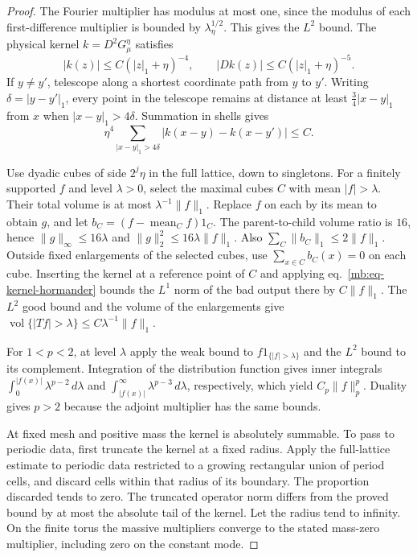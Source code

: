 \documentclass[11pt,letterpaper,reqno]{amsart}
\numberwithin{equation}{section}
\renewcommand{\eqref}[1]{\textup{eq.~\ref{#1}}}
\theoremstyle{definition}
\theoremstyle{remark}
\begin{document}
\begin{proof}
The Fourier multiplier has modulus at most one, since the
modulus of each first-difference multiplier is bounded by
\(\lambda_\eta^{1/2}\). This gives the \(L^2\) bound.
The physical kernel \(k=D^2G_\mu^\eta\) satisfies
\[
 |k(z)|\le C(|z|_1+\eta)^{-4},
 \qquad |Dk(z)|\le C(|z|_1+\eta)^{-5}.
\]
If \(y\ne y'\), telescope along a shortest coordinate path from
\(y\) to \(y'\). Writing \(\delta=|y-y'|_1\), every point in the
telescope remains at distance at least \(\tfrac34|x-y|_1\) from
\(x\) when \(|x-y|_1>4\delta\). Summation in shells gives
\begin{equation}\label{mb:eq-kernel-hormander}
 \eta^4\sum_{|x-y|_1>4\delta}
             |k(x-y)-k(x-y')|\le C .
\end{equation}

Use dyadic cubes of side \(2^j\eta\) in the full lattice, down to
singletons. For a finitely supported \(f\) and level \(\lambda>0\),
select the maximal cubes \(C\) with mean \(|f|>\lambda\).
Their total volume is at most \(\lambda^{-1}\|f\|_1\).
Replace \(f\) on each by its mean to obtain \(g\), and let
\(b_C=(f-\operatorname{mean}_C f)1_C\). The parent-to-child
volume ratio is \(16\), hence \(\|g\|_\infty\le16\lambda\)
and \(\|g\|_2^2\le16\lambda\|f\|_1\). Also
\(\sum_C\|b_C\|_1\le2\|f\|_1\).
Outside fixed enlargements of the selected cubes, use
\(\sum_{x\in C} b_C(x)=0\) on each cube. Inserting the kernel at a reference
point of \(C\) and applying \eqref{mb:eq-kernel-hormander} bounds
the \(L^1\) norm of the bad output there by \(C\|f\|_1\).
The \(L^2\) good bound and the volume of the enlargements give
\(\operatorname{vol}\{|Tf|>\lambda\}\le C\lambda^{-1}\|f\|_1\).

For \(1<p<2\), at level \(\lambda\) apply the weak bound to
\(f1_{\{|f|>\lambda\}}\) and the \(L^2\) bound to its complement.
Integration of the distribution function gives inner integrals
\(\int_0^{|f(x)|}\lambda^{p-2}\,d\lambda\) and
\(\int_{|f(x)|}^\infty\lambda^{p-3}\,d\lambda\), respectively,
which yield \(C_p\|f\|_p^p\). Duality gives \(p>2\) because the
adjoint multiplier has the same bounds.

At fixed mesh and positive mass the kernel is absolutely
summable. To pass to periodic data, first truncate the kernel
at a fixed radius. Apply the full-lattice estimate to periodic
data restricted to a growing rectangular union of period cells,
and discard cells within that radius of its boundary. The
proportion discarded tends to zero. The truncated operator
norm differs from the proved bound by at most the absolute
tail of the kernel. Let the radius tend to infinity. On the
finite torus the massive multipliers converge to the stated
mass-zero multiplier, including zero on the constant mode.
\end{proof}
\end{document}
